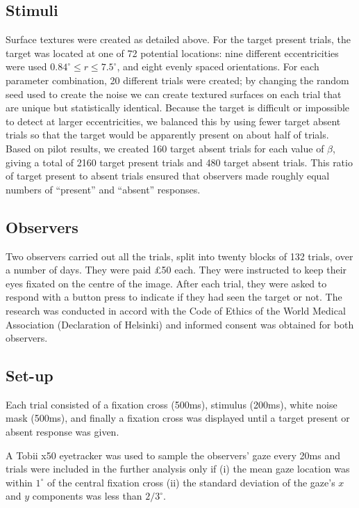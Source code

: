 \documentclass[preprint, authoryear]{elsarticle} %
\begin{document}
\subsection{Stimuli}

Surface textures were created as detailed above. For the target present trials, the target was located at one of 72 potential locations: nine different eccentricities were used $0.84^{\circ}\leq r\leq 7.5^{\circ}$, and eight evenly spaced orientations. For each parameter combination, 20 different trials were created; by changing the random seed used to create the noise we can create textured surfaces on each trial that are unique but statistically identical. Because the target is difficult or impossible to detect at larger eccentricities, we balanced this by using fewer target absent trials so that the target would be apparently present on about half of trials. Based on pilot results, we created 160 target absent trials for each value of $\beta$, giving a total of 2160 target present trials and 480 target absent trials. This ratio of target present to absent trials ensured that observers made roughly equal numbers of ``present'' and ``absent'' responses.

\subsection{Observers}

Two observers carried out all the trials, split into twenty blocks of 132 trials, over a number of days. They were paid \pounds50 each. They were instructed to keep their eyes fixated on the centre of the image. After each trial, they were asked to respond with a button press to indicate if they had seen the target or not. The research was conducted in accord with the Code of Ethics of the World Medical Association (Declaration of Helsinki) and informed consent was obtained for both observers. 

\subsection{Set-up}

 Each trial consisted of a fixation cross (500ms), stimulus (200ms), white noise mask (500ms), and finally a fixation cross was displayed until a target present or absent response was given. 
\par
A Tobii x50 eyetracker was used to sample the observers' gaze every 20ms and trials were included in the further analysis only if (i) the mean gaze location was within $1^{\circ}$ of the central fixation cross (ii) the standard deviation of the gaze's $x$ and $y$ components was less than $2/3^{\circ}$.
\end{document}
